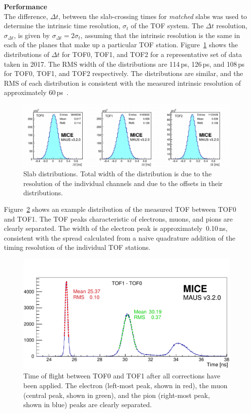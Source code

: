 \noindent\textbf{Performance} \\
\noindent
The difference, $\Delta t$, between the slab-crossing times for \textit{matched} slabs
was used to determine the intrinsic time resolution, $\sigma_t$ of the
TOF system.
The $\Delta t$ resolution, $\sigma_{\Delta t}$, is given by $\sigma_{\Delta t}=2\sigma_t$,
assuming that the intrinsic resolution is the same in each of the planes that make up a particular TOF station.
Figure~\ref{fig:SlabDtAll} shows the distributions of $\Delta t$ for
TOF0, TOF1, and TOF2 for a representative set of data taken in 2017.
The RMS width of the distributions are 114\,ps, 126\,ps, and 108\,ps
for TOF0, TOF1, and TOF2 respectively.
The distributions are similar, and the RMS of each distribution is
consistent with the measured intrinsic resolution of approximately
60\,ps~\cite{2010NIMPA.615...14B}.
\begin{figure}[htb]
  \begin{center}
    \includegraphics[width=0.99\columnwidth]{07_overall_slab_dt_edited2.pdf}
  \end{center}
  \caption{
    Slab \Dt{} distributions.
    Total width of the distribution is due to the resolution of the
    individual channels and due to the offsets in their \Dt{}
    distributions.
  }
  \label{fig:SlabDtAll}
\end{figure}

Figure~\ref{fig:TOF_peaks} shows an example distribution of the
measured TOF between TOF0 and TOF1.
The TOF peaks characteristic of electrons, muons, and pions are
clearly separated.
The width of the electron peak is approximately~0.10\,ns,
consistent with the spread calculated from a naive quadrature addition
of the timing resolution of the individual TOF stations.
\begin{figure}
  \begin{center}
    \includegraphics[width=0.75\columnwidth]{TOF_peaks.pdf}
  \end{center}
  \caption{
    Time of flight between TOF0 and TOF1 after all corrections have
    been applied.
    The electron (left-most peak, shown in red), the muon (central peak, shown in green), and the pion (right-most peak, shown in blue) peaks are clearly separated.
    } 
  \label{fig:TOF_peaks}
\end{figure}
